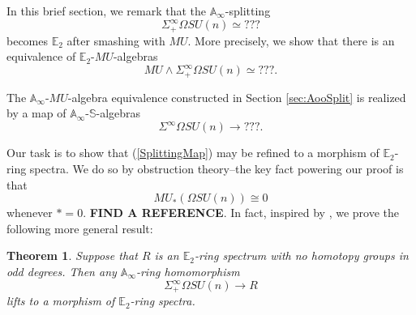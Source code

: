 \documentclass[reqno, oneside]{amsart}
\theoremstyle{definition}
\theoremstyle{plain}
\newtheorem{thm}[nul]{Theorem}
\DeclareMathOperator{\smsh}{\wedge}
\begin{document}
In this brief section, we remark that the $\mathbb{A}_\infty$-splitting $$\Sigma^{\infty}_+ \Omega SU(n) \simeq ???$$ becomes $\mathbb{E}_2$ after smashing with $MU$.  More precisely, we show that there is an equivalence of $\mathbb{E}_2$-$MU$-algebras
$$MU \smsh \Sigma^{\infty}_+ \Omega SU(n) \simeq ???.$$

The $\mathbb{A}_\infty$-$MU$-algebra equivalence constructed in Section \ref{sec:AooSplit} is realized by a map of $\mathbb{A}_\infty$-$\mathbb{S}$-algebras
\begin{equation} \label{SplittingMap}
\Sigma^{\infty} \Omega SU(n) \longrightarrow ???.
\end{equation}

Our task is to show that (\ref{SplittingMap}) may be refined to a morphism of $\mathbb{E}_2$-ring spectra.  We do so by obstruction theory--the key fact powering our proof is that 
$$MU_*\left(\Omega SU(n)\right) \cong 0$$
whenever $*=0$.  \textbf{FIND A REFERENCE}.  In fact, inspired by \cite{ChadwickMandell}, we prove the following more general result:

\begin{thm}
Suppose that $R$ is an $\mathbb{E}_2$-ring spectrum with no homotopy groups in odd degrees.  Then any $\mathbb{A}_\infty$-ring homomorphism
$$\Sigma^{\infty}_+ \Omega SU(n) \rightarrow R$$
lifts to a morphism of $\mathbb{E}_2$-ring spectra.
\end{thm}
\end{document}
